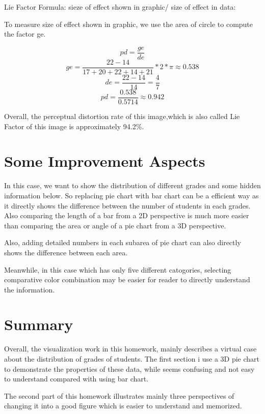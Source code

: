 Lie Factor Formula: sieze of effect shown in graphic/ size of effect in data:

To measure size of effect shown in graphic, we use the area of circle to compute the factor ge.

$$pd=\frac{ge}{de}$$
$$ge=\frac{22-14}{17+20+22+14+21}*2*\pi\approx 0.538$$
$$de=\frac{22-14}{14}=\frac{4}{7}$$
$$pd=\frac{0.538}{0.5714}\approx0.942$$

Overall, the perceptual distortion rate of this image,which is also called Lie Factor of this image is approximately 94.2\%.

\section{Some Improvement Aspects}
In this case, we want to show the distribution of different grades and some hidden information below. So replacing pie chart with bar chart can be a efficient way as it directly shows the difference between the number of students in each grades. Also comparing the length of a bar from a 2D perspective is much more easier than comparing the area or angle of a pie chart from a 3D perspective.

Also, adding detailed numbers in each subarea of pie chart can also directly shows the difference between each area.

Meanwhile, in this case which has only five different catogories, selecting comparative color combination may be easier for reader to directly understand the information.

\section{Summary}
Overall, the visualization work in this homework, mainly describes a virtual case about the distribution of grades of students. The first section i use a 3D pie chart to demonstrate the properties of these data, while seems confusing and not easy to understand compared with using bar chart. 

The second part of this homework illustrates mainly three perspectives of changing it into a good figure which is easier to understand and memorized.

